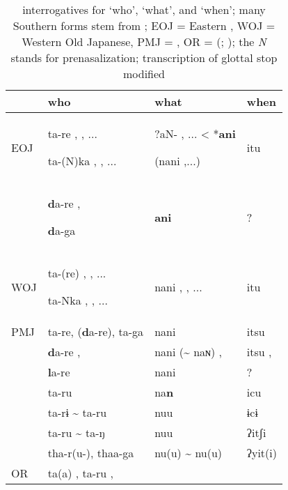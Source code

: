 \begin{table}[t]
\caption{{} interrogatives for ‘who’, ‘what’, and ‘when’; many Southern {} forms stem from \cite[298-299]{Bentley2008a}; EOJ = Eastern , WOJ = Western Old Japanese, PMJ = , OR =  (\citealt{Vovin2005}; \citealt{Kupchik2011}); the \textit{N} stands for prenasalization; transcription of  glottal stop modified}
\label{tab:japa:5}
\small
\begin{tabularx}{\textwidth}{lQll}
\lsptoprule
& \textbf{who} & \textbf{what} & \textbf{when}\\
\midrule
EOJ & ta-re , , ...

ta-(N)ka , , ... & ?aN- , ... < *\textbf{ani}

(nani ,...)\footnotemark & itu \jp{,}\\
\footnotemark & \textbf{d}a-re ,

\textbf{d}a-ga  & \textbf{ani}  & ?\\
WOJ & ta-(re) , , ...

ta-Nka , , ... & nani , , ... & itu \\
PMJ & ta-re, (\textbf{d}a-re), ta-ga & nani & itsu\\
 & \textbf{d}a-re ,  & nani ({\textasciitilde} naɴ) ,  & itsu , \\
 & \textbf{l}a-re & nani & ?\\
 & ta-ru & na\textbf{n} & icu\\
 & ta-rɨ {\textasciitilde} ta-ru & nuu & ɨcɨ\\
 & ta-ru {\textasciitilde} ta-ŋ & nuu & ʔitʃi\\
 & tha-r(u-), thaa-ga & nu(u) {\textasciitilde} nu(u) & ʔyit(i)\\
OR & ta(a) , ta-ru ,


\end{tabularx}
\end{table}
